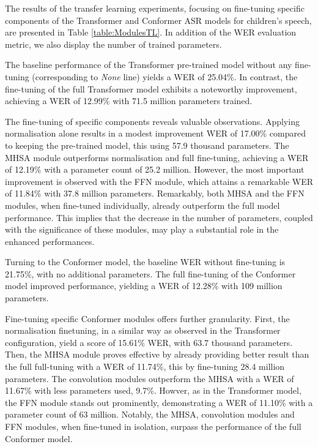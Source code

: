 The results  of the transfer learning experiments, focusing on fine-tuning specific components of the Transformer and Conformer ASR models for children's speech, are presented in Table \ref{table:ModulesTL}. In addition of the WER evaluation metric, we also display the number of trained parameters. 

The baseline performance of the Transformer pre-trained model without any fine-tuning (corresponding to \textit{None} line) yields a WER of 25.04\%. In contrast, the fine-tuning of the full Transformer model exhibits a noteworthy improvement, achieving a WER of 12.99\% with 71.5 million parameters trained.

The fine-tuning of specific components reveals valuable observations. Applying normalisation alone results in a modest improvement WER of 17.00\% compared to keeping the pre-trained model, this using 57.9 thousand parameters. The MHSA module outperforms normalisation and full fine-tuning, achieving a WER of 12.19\% with a parameter count of 25.2 million. However, the most important improvement is observed with the FFN module, which attains a remarkable WER of 11.84\% with 37.8 million parameters. Remarkably, both MHSA and the FFN modules, when fine-tuned individually, already outperform the full model performance. This implies that the decrease in the number of parameters, coupled with the significance of these modules, may play a substantial role in the enhanced performances.

Turning to the Conformer model, the baseline WER without fine-tuning is 21.75\%, with no additional parameters. The full fine-tuning of the Conformer model improved performance, yielding a WER of 12.28\% with 109 million parameters.

Fine-tuning specific Conformer modules offers further granularity. First, the normalisation finetuning, in a similar way as observed in the Transformer configuration, yield a score of 15.61\% WER, with 63.7 thousand parameters. Then,  the MHSA module proves effective by already providing better result than the full full-tuning with a WER of 11.74\%, this by fine-tuning 28.4 million parameters. The convolution modules outperform the MHSA with a WER of 11.67\% with less parameters used, 9.7\%. Howver, as in the Transformer model, the FFN module stands out prominently, demonstrating a WER of 11.10\% with a parameter count of 63 million. Notably, the MHSA, convolution modules and FFN modules, when fine-tuned in isolation, surpass the performance of the full Conformer model.

